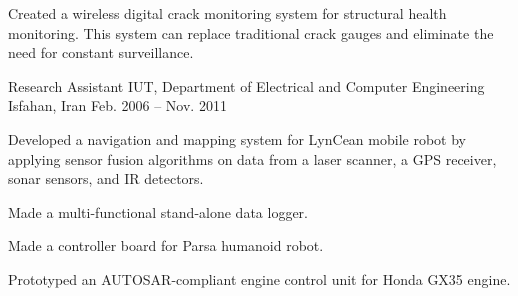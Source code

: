 \begin{cventries}
{\begin{cvitems}
        \item Created a wireless digital crack monitoring system for structural health monitoring. This system can replace  traditional crack gauges and eliminate the need for constant surveillance.
      \end{cvitems}
    }
  \cventry
    {Research Assistant}
    {IUT, Department of Electrical and Computer Engineering}
    {Isfahan, Iran}
    {Feb. 2006 -- Nov. 2011}
    {
      \begin{cvitems}
        \item Developed a navigation and mapping system for LynCean mobile robot by applying sensor fusion algorithms on data from a laser scanner, a GPS receiver, sonar sensors, and IR detectors.
        \item Made a multi-functional stand-alone data logger.
        \item Made a controller board for Parsa humanoid robot.
        \item Prototyped an AUTOSAR-compliant engine control unit for Honda GX35 engine.
      \end{cvitems}
    }
\end{cventries} 